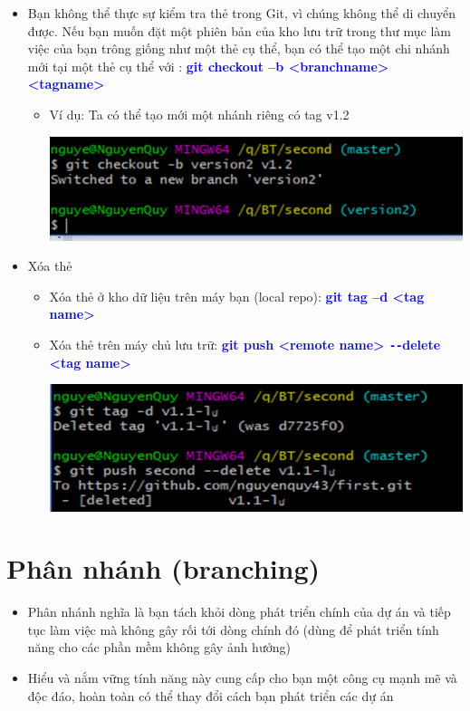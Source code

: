 \documentclass[12pt,a4paper]{report}
\begin{document}
\begin{itemize}
\begin{itemize}
	\label{fig:screenshot045}
\end{itemize}

\item Bạn không thể thực sự kiểm tra thẻ trong Git, vì chúng không thể di chuyển được. Nếu bạn muốn đặt một phiên bản của kho lưu trữ trong thư mục làm việc của bạn trông giống như một thẻ cụ thể, bạn có thể tạo một chi nhánh mới tại một thẻ cụ thể với : \textcolor{blue}{\bf git checkout –b <branchname> <tagname>}
\begin{itemize}
 \item Ví dụ: Ta có thể tạo mới một nhánh riêng có tag v1.2

	\includegraphics[width=0.8\linewidth]{screenshot046}

	\label{fig:screenshot046}

\end{itemize}
\item Xóa thẻ
\begin{itemize}
\item Xóa thẻ ở kho dữ liệu trên máy bạn (local repo): \textcolor{blue}{\bf  git tag –d <tag name>}
\item Xóa thẻ trên máy chủ lưu trữ: \textcolor{blue}{\bf git push <remote name> \texttt{-{}-}delete <tag name>}

	\includegraphics[width=0.8\linewidth]{screenshot047}
	
	\label{fig:screenshot047}
\end{itemize}\end{itemize}
			
\section{Phân nhánh (branching)}
\begin{itemize}
\item Phân nhánh nghĩa là bạn tách khỏi dòng phát triển chính của dự án và tiếp tục làm việc mà không gây rối tới dòng chính đó (dùng để phát triển tính năng cho các phần mềm không gây ảnh hưởng)\vskip 0.4cm
\item Hiểu và nắm vững tính năng này cung cấp cho bạn một công cụ mạnh mẽ và độc đáo, hoàn toàn có thể thay đổi cách bạn phát triển các dự án
\end{itemize}
\end{document}
